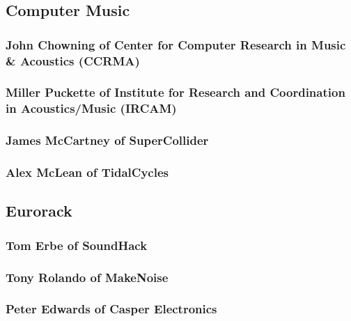 \documentclass[
  american,
  12pt,
]{article}
\begin{document}
\subsection{Computer Music}\label{computer-music}

\subsubsection{John Chowning of Center for Computer Research in Music \&
Acoustics
(CCRMA)}\label{john-chowning-of-center-for-computer-research-in-music-acoustics-ccrma}

\subsubsection{Miller Puckette of Institute for Research and
Coordination in Acoustics/Music
(IRCAM)}\label{miller-puckette-of-institute-for-research-and-coordination-in-acousticsmusic-ircam}

\subsubsection{James McCartney of
SuperCollider}\label{james-mccartney-of-supercollider}

\subsubsection{Alex McLean of
TidalCycles}\label{alex-mclean-of-tidalcycles}

\subsection{Eurorack}\label{eurorack}

\subsubsection{Tom Erbe of SoundHack}\label{tom-erbe-of-soundhack}

\subsubsection{Tony Rolando of
MakeNoise}\label{tony-rolando-of-makenoise}

\subsubsection{Peter Edwards of Casper
Electronics}\label{peter-edwards-of-casper-electronics}
\end{document}
